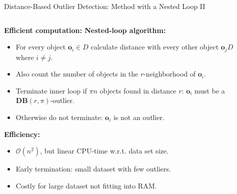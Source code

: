 \begin{frame}{Distance-Based Outlier Detection: Method with a Nested Loop II}
	\begin{columns}[t]
		\begin{column}{0.5\textwidth}
			\vspace*{-0.5em}
			\textbf{Efficient computation: {\color{airforceblue}Nested-loop algorithm}:}
			\begin{itemize}
				\item For every object $\mathbf{o}_i\in D$ calculate distance with every other object $\mathbf{o}_j D$ where $i\neq j$.
				\item Also count the number of objects in the $r$-neighborhood of $\mathbf{o}_i$.
				\item Terminate inner loop if $\pi n$ objects found in distance $r$: $\mathbf{o}_i$ must be a $\mathbf{DB}(r, \pi)$-outlier.
				\item Otherwise do not terminate: $\mathbf{o}_i$ is not an outlier.
			\end{itemize}
			\textbf{Efficiency:}
			\begin{itemize}
				\item $\mathcal{O}(n^2)$, but linear CPU-time w.r.t. data set size.
				\item Early termination: small dataset with few outliers.
				\item Costly for large dataset not fitting into RAM.
			\end{itemize}
		\end{column}

		\begin{column}{0.5\textwidth}
			\vspace*{1em}
			\scriptsize
			\begin{algorithm}[H]
				\SetAlgoVlined
				\BlankLine
				\BlankLine
			\end{algorithm}
		\end{column}
	\end{columns}
\end{frame}


